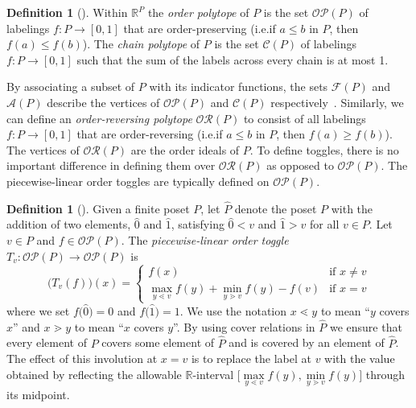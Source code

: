 \documentclass[10pt]{amsart}
\theoremstyle{definition}
\newtheorem{defi}[theo]{Definition}
\newcommand{\ie}{i.e.}
\newcommand{\defn}[1]{\emph{#1}}
\newcommand{\rr}{\mathbb{R}}
\newcommand{\ra}{\rightarrow}
\newcommand{\cala}{\mathcal{A}}
\newcommand{\calc}{\mathcal{C}}
\newcommand{\calf}{\mathcal{F}}
\newcommand{\calo}{\mathcal{O}}
\newcommand{\calp}{\mathcal{P}}
\newcommand{\calr}{\mathcal{R}}
\begin{document}
\begin{defi}[\cite{Sta86}]
Within $\rr^{P}$ the \defn{order polytope} of $P$ is the set $\calo\calp(P)$ of labelings $f:P\ra [0,1]$ that are order-preserving (\ie if $a\leq b$ in $P$, then $f(a)\leq f(b)$).
The \defn{chain polytope} of $P$ is the set $\calc(P)$ of labelings $f:P\ra [0,1]$ such that the sum of the labels across every chain is at most 1.
\end{defi}

By associating a subset of $P$ with its indicator functions, the sets $\calf(P)$ and $\cala(P)$ describe the vertices of $\calo\calp(P)$ and $\calc(P)$ respectively~\cite{Sta86}.
Similarly, we can define an \defn{order-reversing polytope} $\calo\calr(P)$ to consist of all labelings $f:P\ra [0,1]$ that are order-reversing (\ie if $a\leq b$ in $P$, then $f(a)\geq f(b)$). The vertices of $\calo\calr(P)$ are the order ideals of $P$.
To define toggles, there is no important difference in defining them over $\calo\calr(P)$ as opposed to $\calo\calp(P)$. The piecewise-linear order toggles are typically defined on $\calo\calp(P)$.

\begin{defi}[\cite{einpropp}]
Given a finite poset $P$, let $\widehat{P}$ denote the poset $P$ with the addition of two
elements, $\widehat{0}$ and $\widehat{1}$, satisfying $\widehat{0}< v$ and $\widehat{1}>v$
for all $v\in P$. 
Let $v\in P$ and $f\in\calo\calp(P)$.
The \defn{piecewise-linear order toggle} $T_v:\calo\calp(P)\ra \calo\calp(P)$ is
\[
\big(T_v(f)\big)(x) =
\begin{cases}
f(x) &\text{if }x\not=v\\
\max\limits_{y\lessdot v} f(y) + 
\min\limits_{y\gtrdot v} f(y) - f(v)
&\text{if }x=v\end{cases}
\]
where we set $f\big(\widehat{0}\big)=0$ and $f\big(\widehat{1}\big)=1$.
We use the notation $x\lessdot y$ to mean ``$y$ covers $x$'' and $x\gtrdot y$ to mean ``$x$
covers $y$''. By using cover relations in $\widehat{P}$ we ensure that every element
of $P$ covers some element of $\widehat{P}$ and is covered by an element of $\widehat{P}$. 
The effect of this involution at $x=v$ is to replace the label at $v$ with the value obtained
by reflecting the allowable $\rr$-interval $\Big[\max\limits_{y\lessdot v} f(y), \min\limits_{y\gtrdot
v} f(y)\Big]$ through its midpoint.
\end{defi}
\end{document}
